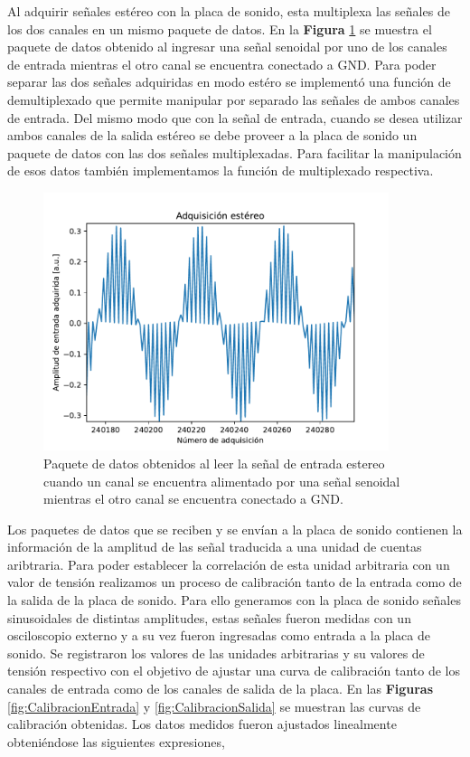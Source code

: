 \documentclass[a4paper,11pt]{article}
\begin{document}
Al adquirir señales estéreo con la placa de sonido, esta multiplexa las
señales de los dos canales en un mismo paquete de datos. En la
\textbf{Figura} \ref{fig:multiplexado} se muestra el paquete de datos
obtenido al ingresar una señal senoidal por uno de los canales de
entrada mientras el otro canal se encuentra conectado a
GND.
Para poder separar las dos señales adquiridas en modo estéro se
implementó una función de demultiplexado que permite manipular por
separado las señales de ambos canales de entrada.  Del mismo modo que
con la señal de entrada, cuando se desea utilizar ambos canales de la
salida estéreo se debe proveer a la placa de sonido un paquete de datos
con las dos señales multiplexadas. Para facilitar la manipulación de esos
datos también implementamos la función de multiplexado respectiva.

    \begin{figure}[!h] 
        \centering
        \includegraphics[width=0.9\textwidth]{imagenes/estereo.pdf}
        \caption{Paquete de datos obtenidos al leer la señal de entrada
estereo cuando un canal se encuentra alimentado por una señal senoidal
mientras el otro canal se encuentra conectado a GND.}
        \label{fig:multiplexado} 
    \end{figure}

Los paquetes de datos que se reciben y se envían a la placa de sonido
contienen la información de la amplitud de las señal traducida a una
unidad de cuentas aribtraria. Para poder establecer la correlación de
esta unidad arbitraria con un valor de tensión realizamos un proceso de
calibración tanto de la entrada como de la salida de la placa de sonido.
Para ello generamos con la placa de sonido señales sinusoidales de
distintas amplitudes, estas señales fueron medidas con un osciloscopio
externo y a su vez fueron ingresadas como entrada a la placa de sonido.
Se registraron los valores de las unidades arbitrarias y su valores de
tensión respectivo con el objetivo de ajustar una curva de calibración
tanto de los canales de entrada como de los canales de salida de la
placa.  En las \textbf{Figuras} \ref{fig:CalibracionEntrada} y
\ref{fig:CalibracionSalida} se muestran las curvas de calibración
obtenidas.  Los datos medidos fueron ajustados linealmente obteniéndose
las siguientes expresiones,
	
\end{document}
